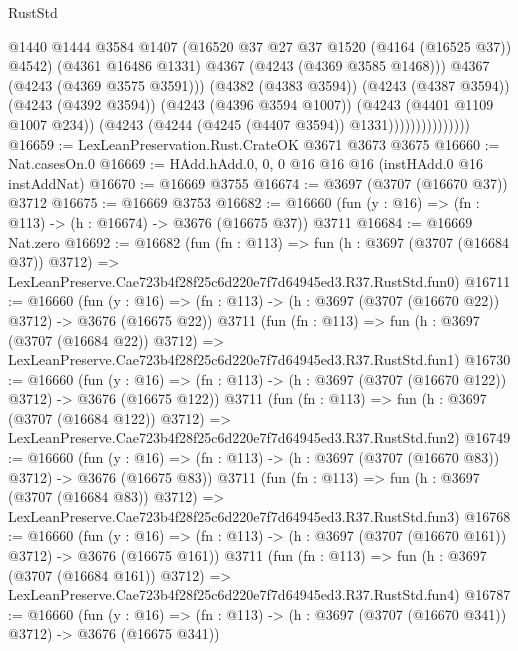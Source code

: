 \begin{lexlean}{RustStd}
\begin{coremodule}
                                  @1440
                                  @1444
                                  @3584
                                  @1407
                                  (@16520 @37 @27 @37 @1520 (@4164 (@16525 @37)) @4542)
                                  (@4361 @16486 @1331)
                                  @4367
                                  (@4243 (@4369 @3585 @1468)))
                                @4367
                                (@4243 (@4369 @3575 @3591)))
                              (@4382 (@4383 @3594))
                              (@4243 (@4387 @3594))
                              (@4243 (@4392 @3594))
                              (@4243 (@4396 @3594 @1007))
                              (@4243 (@4401 @1109 @1007 @234))
                              (@4243 (@4244 (@4245 (@4407 @3594)) @1331)))))))))))))))
@16659 := LexLeanPreservation.Rust.CrateOK @3671 @3673 @3675
@16660 := Nat.casesOn.{0}
@16669 := HAdd.hAdd.{0, 0, 0} @16 @16 @16 (instHAdd.{0} @16 instAddNat)
@16670 := @16669 @3755
@16674 := @3697 (@3707 (@16670 @37)) @3712
@16675 := @16669 @3753
@16682 := @16660 (fun (y : @16) => (fn : @113) -> (h : @16674) -> @3676 (@16675 @37)) @3711
@16684 := @16669 Nat.zero
@16692 := @16682
    (fun (fn : @113) =>
    fun (h : @3697 (@3707 (@16684 @37)) @3712) =>
    LexLeanPreserve.Cae723b4f28f25c6d220e7f7d64945ed3.R37.RustStd.fun0)
@16711 := @16660
    (fun (y : @16) => (fn : @113) -> (h : @3697 (@3707 (@16670 @22)) @3712) -> @3676 (@16675 @22))
    @3711
    (fun (fn : @113) =>
    fun (h : @3697 (@3707 (@16684 @22)) @3712) =>
    LexLeanPreserve.Cae723b4f28f25c6d220e7f7d64945ed3.R37.RustStd.fun1)
@16730 := @16660
    (fun (y : @16) => (fn : @113) -> (h : @3697 (@3707 (@16670 @122)) @3712) -> @3676 (@16675 @122))
    @3711
    (fun (fn : @113) =>
    fun (h : @3697 (@3707 (@16684 @122)) @3712) =>
    LexLeanPreserve.Cae723b4f28f25c6d220e7f7d64945ed3.R37.RustStd.fun2)
@16749 := @16660
    (fun (y : @16) => (fn : @113) -> (h : @3697 (@3707 (@16670 @83)) @3712) -> @3676 (@16675 @83))
    @3711
    (fun (fn : @113) =>
    fun (h : @3697 (@3707 (@16684 @83)) @3712) =>
    LexLeanPreserve.Cae723b4f28f25c6d220e7f7d64945ed3.R37.RustStd.fun3)
@16768 := @16660
    (fun (y : @16) => (fn : @113) -> (h : @3697 (@3707 (@16670 @161)) @3712) -> @3676 (@16675 @161))
    @3711
    (fun (fn : @113) =>
    fun (h : @3697 (@3707 (@16684 @161)) @3712) =>
    LexLeanPreserve.Cae723b4f28f25c6d220e7f7d64945ed3.R37.RustStd.fun4)
@16787 := @16660
    (fun (y : @16) => (fn : @113) -> (h : @3697 (@3707 (@16670 @341)) @3712) -> @3676 (@16675 @341))

\end{coremodule}
\end{lexlean}
